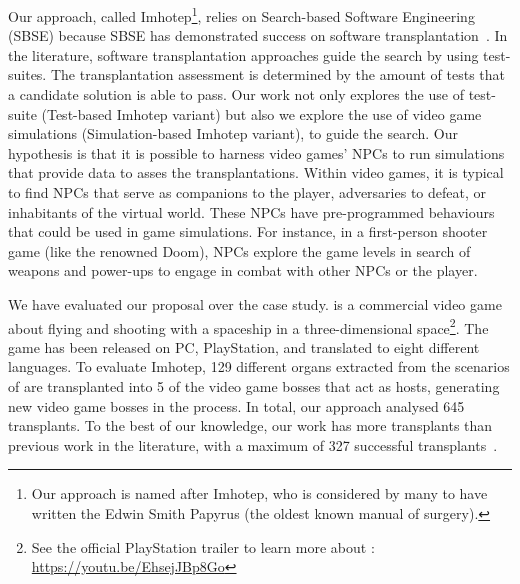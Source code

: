 
Our approach, called Imhotep\footnote{Our approach is named after Imhotep, who is considered by many to have written the Edwin Smith Papyrus (the oldest known manual of surgery).}, relies on Search-based Software Engineering (SBSE) because SBSE has demonstrated success on software transplantation~\cite{barr2015automated}. In the literature, software transplantation approaches guide the search by using test-suites. The transplantation assessment is determined by the amount of tests that a candidate solution is able to pass. Our work not only explores the use of test-suite (Test-based Imhotep variant) but also we explore the use of video game simulations (Simulation-based Imhotep variant), to guide the search.  Our hypothesis is that it is possible to harness video games' NPCs to run simulations that provide data to asses the transplantations. Within video games, it is typical to find NPCs that serve as companions to the player, adversaries to defeat, or inhabitants of the virtual world. These NPCs have pre-programmed behaviours that could be used in game simulations. For instance, in a first-person shooter game (like the renowned Doom), NPCs explore the game levels in search of weapons and power-ups to engage in combat with other NPCs or the player.

We have evaluated our proposal over the \CaseStudy{} case study. \CaseStudy{} is a commercial video game about flying and shooting with a spaceship in a three-dimensional space\footnote{See the official PlayStation trailer to learn more about \CaseStudy{}: \url{https://youtu.be/EhsejJBp8Go}}. The game has been released on PC, PlayStation, and translated to eight different languages.
To evaluate Imhotep, 129 different organs extracted from the scenarios of \CaseStudy{} are transplanted into 5 of the video game bosses that act as hosts, generating new video game bosses in the process. 
In total, our approach analysed 645 transplants. To the best of our knowledge, our work has more transplants than previous work in the literature, with a maximum of 327 successful transplants~\cite{reid2020optimising}.

